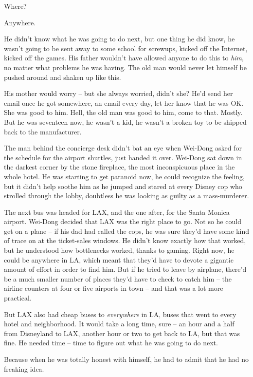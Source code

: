 Where?

Anywhere.

He didn't know what he was going to do next, but one thing he did
know, he wasn't going to be sent away to some school for screwups,
kicked off the Internet, kicked off the games. His father wouldn't
have allowed anyone to do this to \emph{him}, no matter what
problems he was having. The old man would never let himself be
pushed around and shaken up like this.

His mother would worry -- but she always worried, didn't she? He'd
send her email once he got somewhere, an email every day, let her
know that he was OK. She was good to him. Hell, the old man was
good to him, come to that. Mostly. But he was seventeen now, he
wasn't a kid, he wasn't a broken toy to be shipped back to the
manufacturer.

The man behind the concierge desk didn't bat an eye when Wei-Dong
asked for the schedule for the airport shuttles, just handed it
over. Wei-Dong sat down in the darkest corner by the stone
fireplace, the most inconspicuous place in the whole hotel. He was
starting to get paranoid now, he could recognize the feeling, but
it didn't help soothe him as he jumped and stared at every Disney
cop who strolled through the lobby, doubtless he was looking as
guilty as a mass-murderer.

The next bus was headed for LAX, and the one after, for the Santa
Monica airport. Wei-Dong decided that LAX was the right place to
go. Not so he could get on a plane -- if his dad had called the
cops, he was sure they'd have some kind of trace on at the
ticket-sales windows. He didn't know exactly how that worked, but
he understood how bottlenecks worked, thanks to gaming. Right now,
he could be anywhere in LA, which meant that they'd have to devote
a gigantic amount of effort in order to find him. But if he tried
to leave by airplane, there'd be a much smaller number of places
they'd have to check to catch him -- the airline counters at four
or five airports in town -- and that was a lot more practical.

But LAX also had cheap buses to \emph{everywhere} in LA, buses that
went to every hotel and neighborhood. It would take a long time,
sure -- an hour and a half from Disneyland to LAX, another hour or
two to get back to LA, but that was fine. He needed time -- time to
figure out what he was going to do next.

Because when he was totally honest with himself, he had to admit
that he had no freaking idea.


